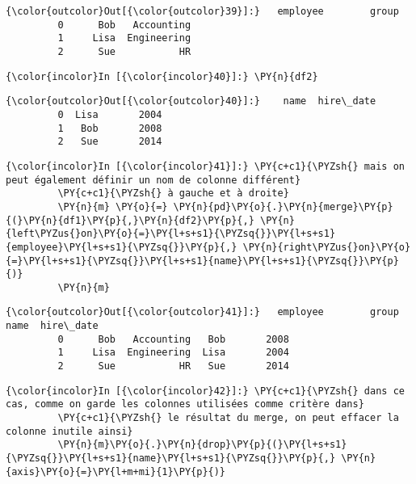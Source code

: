 \begin{Verbatim}[commandchars=\\\{\}]
{\color{outcolor}Out[{\color{outcolor}39}]:}   employee        group
         0      Bob   Accounting
         1     Lisa  Engineering
         2      Sue           HR
\end{Verbatim}
            
    \begin{Verbatim}[commandchars=\\\{\}]
{\color{incolor}In [{\color{incolor}40}]:} \PY{n}{df2}
\end{Verbatim}


\begin{Verbatim}[commandchars=\\\{\}]
{\color{outcolor}Out[{\color{outcolor}40}]:}    name  hire\_date
         0  Lisa       2004
         1   Bob       2008
         2   Sue       2014
\end{Verbatim}
            
    \begin{Verbatim}[commandchars=\\\{\}]
{\color{incolor}In [{\color{incolor}41}]:} \PY{c+c1}{\PYZsh{} mais on peut également définir un nom de colonne différent}
         \PY{c+c1}{\PYZsh{} à gauche et à droite}
         \PY{n}{m} \PY{o}{=} \PY{n}{pd}\PY{o}{.}\PY{n}{merge}\PY{p}{(}\PY{n}{df1}\PY{p}{,}\PY{n}{df2}\PY{p}{,} \PY{n}{left\PYZus{}on}\PY{o}{=}\PY{l+s+s1}{\PYZsq{}}\PY{l+s+s1}{employee}\PY{l+s+s1}{\PYZsq{}}\PY{p}{,} \PY{n}{right\PYZus{}on}\PY{o}{=}\PY{l+s+s1}{\PYZsq{}}\PY{l+s+s1}{name}\PY{l+s+s1}{\PYZsq{}}\PY{p}{)}
         \PY{n}{m}
\end{Verbatim}


\begin{Verbatim}[commandchars=\\\{\}]
{\color{outcolor}Out[{\color{outcolor}41}]:}   employee        group  name  hire\_date
         0      Bob   Accounting   Bob       2008
         1     Lisa  Engineering  Lisa       2004
         2      Sue           HR   Sue       2014
\end{Verbatim}
            
    \begin{Verbatim}[commandchars=\\\{\}]
{\color{incolor}In [{\color{incolor}42}]:} \PY{c+c1}{\PYZsh{} dans ce cas, comme on garde les colonnes utilisées comme critère dans}
         \PY{c+c1}{\PYZsh{} le résultat du merge, on peut effacer la colonne inutile ainsi}
         \PY{n}{m}\PY{o}{.}\PY{n}{drop}\PY{p}{(}\PY{l+s+s1}{\PYZsq{}}\PY{l+s+s1}{name}\PY{l+s+s1}{\PYZsq{}}\PY{p}{,} \PY{n}{axis}\PY{o}{=}\PY{l+m+mi}{1}\PY{p}{)}
\end{Verbatim}


